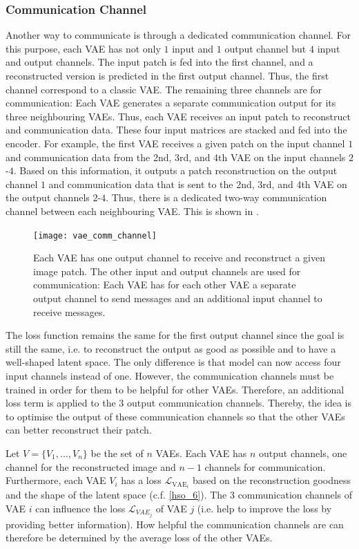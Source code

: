 \subsubsection{Communication Channel}
Another way to communicate is through a dedicated communication channel. For this purpose, each VAE has not only $1$ input and $1$ output channel but $4$ input and output channels. The input patch is fed into the first channel, and a reconstructed version is predicted in the first output channel. Thus, the first channel correspond to a classic VAE.
The remaining three channels are for communication: Each VAE generates a separate communication output for its three neighbouring VAEs. Thus, each VAE receives an input patch to reconstruct and communication data. These four input matrices are stacked and fed into the encoder. For example, the first VAE receives a given patch on the input channel $1$ and communication data from the 2nd, 3rd, and 4th VAE on the input channels $2$-$4$. Based on this information, it outputs a patch reconstruction on the output channel $1$ and communication data that is sent to the 2nd, 3rd, and 4th VAE on the output channels $2$-$4$. Thus, there is a dedicated two-way communication channel between each neighbouring VAE. This is shown in .

\begin{figure}[h]
    \centering
    \texttt{[image: vae\_comm\_channel]}
    \caption[Communication between VAEs with a dedicated communication channel]{Each VAE has one output channel to receive and reconstruct a given image patch. The other input and output channels are used for communication: Each VAE has for each other VAE a separate output channel to send messages and an additional input channel to receive messages.}
\end{figure}

The loss function remains the same for the first output channel since the goal is still the same, i.e. to reconstruct the output as good as possible and to have a well-shaped latent space. The only difference is that model can now access four input channels instead of one. However, the communication channels must be trained in order for them to be helpful for other VAEs. Therefore, an additional loss term is applied to the $3$ output communication channels. Thereby, the idea is to optimise the output of these communication channels so that the other VAEs can better reconstruct their patch.

Let $V = \{V_1, ..., V_n \}$ be the set of $n$ VAEs. Each VAE has $n$ output channels, one channel for the reconstructed image and $n-1$ channels for communication. Furthermore, each VAE $V_i$ has a loss $\mathcal{L}_{\text{VAE}_i}$ based on the reconstruction goodness and the shape of the latent space (c.f. \eqref{hso_6}). The $3$ communication channels of VAE $i$ can influence the loss $\mathcal{L}_{VAE_j}$ of VAE $j$ (i.e. help to improve the loss by providing better information). How helpful the communication channels are can therefore be determined by the average loss of the other VAEs.

